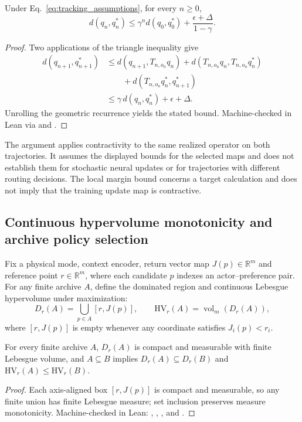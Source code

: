 \begin{proposition}
\label{prop:tracking_current}
Under Eq.~\eqref{eq:tracking_assumptions}, for every $n \geq 0$,
\begin{equation}
 d(q_n, q_n^*) \leq \gamma^n d(q_0, q_0^*) +
                    \frac{\epsilon + \Delta}{1 - \gamma}.
\end{equation}
\end{proposition}
\begin{proof}
Two applications of the triangle inequality give
\begin{align*}
d(q_{n+1},q_{n+1}^*)
 &\leq d(q_{n+1},T_{n,o_n}q_n) + d(T_{n,o_n}q_n,T_{n,o_n}q_n^*) \\
 &\qquad {}+ d(T_{n,o_n}q_n^*,q_{n+1}^*) \\
 &\leq \gamma\,d(q_n,q_n^*)+\epsilon+\Delta.
\end{align*}
Unrolling the geometric recurrence yields the stated bound. Machine-checked in
Lean via  and
.
\end{proof}

The argument applies contractivity to the same realized operator on both
trajectories. It assumes the displayed bounds for the selected maps and
does not establish them for stochastic neural updates or for trajectories
with different routing decisions. The local margin bound concerns a target
calculation and does not imply that the training update map is contractive.

\subsection{Continuous hypervolume monotonicity and archive policy selection}
\label{app:archive_current}

Fix a physical mode, context encoder, return vector map $J(p) \in \mathbb{R}^m$
and reference point $r \in \mathbb{R}^m$, where each candidate $p$ indexes an
actor--preference pair. For any finite archive $A$, define the dominated region
and continuous Lebesgue hypervolume under maximization:
\begin{equation}
 D_r(A) = \bigcup_{p \in A}[r, J(p)],\qquad
 \mathrm{HV}_r(A) = \operatorname{vol}_m(D_r(A)),
\end{equation}
where $[r, J(p)]$ is empty whenever any coordinate satisfies $J_i(p) < r_i$.

\begin{proposition}
\label{prop:hv_current}
For every finite archive $A$, $D_r(A)$ is compact and measurable with finite
Lebesgue volume, and $A \subseteq B$ implies $D_r(A) \subseteq D_r(B)$ and
$\mathrm{HV}_r(A) \leq \mathrm{HV}_r(B)$.
\end{proposition}
\begin{proof}
Each axis-aligned box $[r, J(p)]$ is compact and measurable, so any finite union
has finite Lebesgue measure; set inclusion preserves measure monotonicity.
Machine-checked in Lean: ,
, , 
and .
\end{proof}

